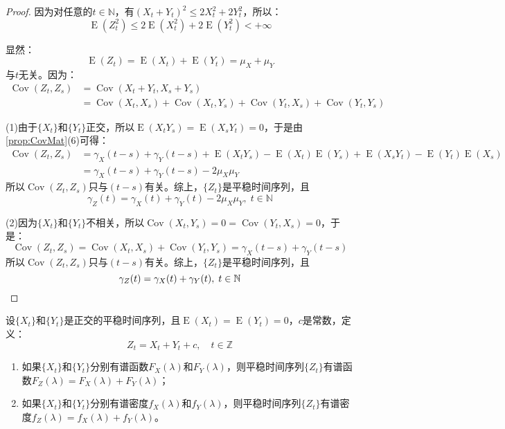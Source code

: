\begin{proof}
	因为对任意的$t\in\mathbb{N}$，有$(X_t+Y_t)^2\leqslant2X_t^2+2Y_t^2$，所以：
	\begin{equation*}
		\operatorname{E}(Z_t^2)\leqslant2\operatorname{E}(X_t^2)+2\operatorname{E}(Y_t^2)<+\infty
	\end{equation*}\par
	显然：
	\begin{equation*}
		\operatorname{E}(Z_t)=\operatorname{E}(X_t)+\operatorname{E}(Y_t)=\mu_X+\mu_Y
	\end{equation*}
	与$t$无关。因为：
	\begin{align*}
		\operatorname{Cov}(Z_t,Z_s)
		&=\operatorname{Cov}(X_t+Y_t,X_s+Y_s) \\
		&=\operatorname{Cov}(X_t,X_s)+\operatorname{Cov}(X_t,Y_s)+\operatorname{Cov}(Y_t,X_s)+\operatorname{Cov}(Y_t,Y_s)
	\end{align*}\par
	(1)由于$\{X_t\}$和$\{Y_t\}$正交，所以$\operatorname{E}(X_tY_s)=\operatorname{E}(X_sY_t)=0$，于是由\cref{prop:CovMat}(6)可得：
	\begin{align*}
		\operatorname{Cov}(Z_t,Z_s)
		&=\gamma_X(t-s)+\gamma_Y(t-s)+\operatorname{E}(X_tY_s)-\operatorname{E}(X_t)\operatorname{E}(Y_s)+\operatorname{E}(X_sY_t)-\operatorname{E}(Y_t)\operatorname{E}(X_s) \\
		&=\gamma_X(t-s)+\gamma_Y(t-s)-2\mu_X\mu_Y
	\end{align*}
	所以$\operatorname{Cov}(Z_t,Z_s)$只与$(t-s)$有关。综上，$\{Z_t\}$是平稳时间序列，且
	\begin{equation*}
		\gamma_Z(t)=\gamma_X(t)+\gamma_Y(t)-2\mu_X\mu_Y,\;t\in\mathbb{N}
	\end{equation*}\par
	(2)因为$\{X_t\}$和$\{Y_t\}$不相关，所以$\operatorname{Cov}(X_t,Y_s)=0=\operatorname{Cov}(Y_t,X_s)=0$，于是：
	\begin{equation*}
		\operatorname{Cov}(Z_t,Z_s)=\operatorname{Cov}(X_t,X_s)+\operatorname{Cov}(Y_t,Y_s)=\gamma_X(t-s)+\gamma_Y(t-s)
	\end{equation*}
	所以$\operatorname{Cov}(Z_t,Z_s)$只与$(t-s)$有关。综上，$\{Z_t\}$是平稳时间序列，且
	\begin{equation*}
		\gamma_Z(t)=\gamma_X(t)+\gamma_Y(t),\;t\in\mathbb{N}\qedhere
	\end{equation*}
\end{proof}
\begin{theorem}
	设$\{X_t\}$和$\{Y_t\}$是正交的平稳时间序列，且$\operatorname{E}(X_t)=\operatorname{E}(Y_t)=0$，$c$是常数，定义：
	\begin{equation*}
		Z_t=X_t+Y_t+c,\quad t\in\mathbb{Z}^{}
	\end{equation*}
	\begin{enumerate}
		\item 如果$\{X_t\}$和$\{Y_t\}$分别有谱函数$F_X(\lambda)$和$F_Y(\lambda)$，则平稳时间序列$\{Z_t\}$有谱函数$F_Z(\lambda)=F_X(\lambda)+F_Y(\lambda)$；
		\item 如果$\{X_t\}$和$\{Y_t\}$分别有谱密度$f_X(\lambda)$和$f_Y(\lambda)$，则平稳时间序列$\{Z_t\}$有谱密度$f_Z(\lambda)=f_X(\lambda)+f_Y(\lambda)$。
	\end{enumerate}
\end{theorem}
